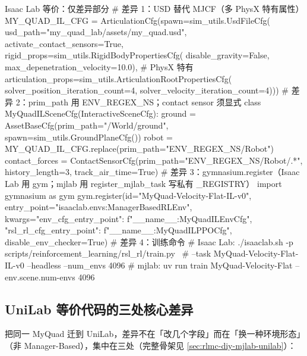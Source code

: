 \begin{codebox}[Python]{Isaac Lab 等价：仅差异部分}
# 差异 1：USD 替代 MJCF（多 PhysX 特有属性）
MY_QUAD_IL_CFG = ArticulationCfg(spawn=sim_utils.UsdFileCfg(
    usd_path="my_quad_lab/assets/my_quad.usd", activate_contact_sensors=True,
    rigid_props=sim_utils.RigidBodyPropertiesCfg(
        disable_gravity=False, max_depenetration_velocity=10.0),     # PhysX 特有
    articulation_props=sim_utils.ArticulationRootPropertiesCfg(
        solver_position_iteration_count=4, solver_velocity_iteration_count=4)))
# 差异 2：prim_path 用 {ENV_REGEX_NS}；contact sensor 须显式
class MyQuadILSceneCfg(InteractiveSceneCfg):
    ground = AssetBaseCfg(prim_path="/World/ground", spawn=sim_utils.GroundPlaneCfg())
    robot  = MY_QUAD_IL_CFG.replace(prim_path="{ENV_REGEX_NS}/Robot")
    contact_forces = ContactSensorCfg(prim_path="{ENV_REGEX_NS}/Robot/.*",
        history_length=3, track_air_time=True)
# 差异 3：gymnasium.register（Isaac Lab 用 gym；mjlab 用 register_mjlab_task 写私有 _REGISTRY）
import gymnasium as gym
gym.register(id="MyQuad-Velocity-Flat-IL-v0",
    entry_point="isaaclab.envs:ManagerBasedRLEnv",
    kwargs={"env_cfg_entry_point": f"{__name__}:MyQuadILEnvCfg",
            "rsl_rl_cfg_entry_point": f"{__name__}:MyQuadILPPOCfg"},
    disable_env_checker=True)
# 差异 4：训练命令
#   Isaac Lab: ./isaaclab.sh -p scripts/reinforcement_learning/rsl_rl/train.py \
#              --task MyQuad-Velocity-Flat-IL-v0 --headless --num_envs 4096
#   mjlab:     uv run train MyQuad-Velocity-Flat --env.scene.num-envs 4096
\end{codebox}

\subsection{UniLab 等价代码的三处核心差异}
\label{sec:rlmc-diy-fullcode-unilab}

把同一 MyQuad 迁到 UniLab，差异不在「改几个字段」而在「换一种环境形态」（非 Manager-Based），集中在三处（完整骨架见 \cref{sec:rlmc-diy-mjlab-unilab}）：

